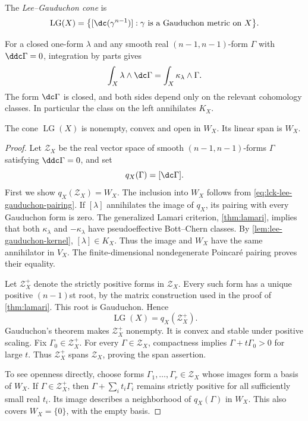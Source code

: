 \begin{definition}
The \emph{Lee--Gauduchon cone} is
\[
 \operatorname{LG}(X)
 =\bigl\{[\dc(\gamma^{n-1})]:
                    \gamma\text{ is a Gauduchon metric on }X\bigr\}.
\]
\end{definition}

For a closed one-form $\lambda$ and any smooth real $(n-1,n-1)$-form $\Gamma$ with $\ddc\Gamma=0$, integration by parts gives
\begin{equation}\label{eq:lck-lee-gauduchon-pairing}
 \int_X\lambda\wedge\dc\Gamma
 =\int_X\kappa_\lambda\wedge\Gamma.
\end{equation}
The form $\dc\Gamma$ is closed, and both sides depend only on the relevant cohomology classes. In particular the class on the left annihilates $K_X$.

\begin{proposition}\label{prop:lee-gauduchon-open}
The cone $\operatorname{LG}(X)$ is nonempty, convex and open in $W_X$. Its linear span is $W_X$.
\end{proposition}
\begin{proof}
Let $\mathcal Z_X$ be the real vector space of smooth $(n-1,n-1)$-forms $\Gamma$ satisfying $\ddc\Gamma=0$, and set
\[
 q_X(\Gamma)=[\dc\Gamma].
\]
First we show $q_X(\mathcal Z_X)=W_X$. The inclusion into $W_X$ follows from \eqref{eq:lck-lee-gauduchon-pairing}. If $[\lambda]$ annihilates the image of $q_X$, its pairing with every Gauduchon form is zero. The generalized Lamari criterion, \cref{thm:lamari}, implies that both $\kappa_\lambda$ and $-\kappa_\lambda$ have pseudoeffective Bott--Chern classes. By \cref{lem:lee-gauduchon-kernel}, $[\lambda]\in K_X$. Thus the image and $W_X$ have the same annihilator in $V_X$. The finite-dimensional nondegenerate Poincar\'e pairing proves their equality.

Let $\mathcal Z_X^+$ denote the strictly positive forms in $\mathcal Z_X$. Every such form has a unique positive $(n-1)$st root, by the matrix construction used in the proof of \cref{thm:lamari}. This root is Gauduchon. Hence
\[
 \operatorname{LG}(X)=q_X(\mathcal Z_X^+).
\]
Gauduchon's theorem makes $\mathcal Z_X^+$ nonempty. It is convex and stable under positive scaling. Fix $\Gamma_0\in\mathcal Z_X^+$. For every $\Gamma\in\mathcal Z_X$, compactness implies $\Gamma+t\Gamma_0>0$ for large $t$. Thus $\mathcal Z_X^+$ spans $\mathcal Z_X$, proving the span assertion.

To see openness directly, choose forms $\Gamma_1,\ldots,\Gamma_r\in\mathcal Z_X$ whose images form a basis of $W_X$. If $\Gamma\in\mathcal Z_X^+$, then $\Gamma+\sum_i t_i\Gamma_i$ remains strictly positive for all sufficiently small real $t_i$. Its image describes a neighborhood of $q_X(\Gamma)$ in $W_X$. This also covers $W_X=\{0\}$, with the empty basis.
\end{proof}


